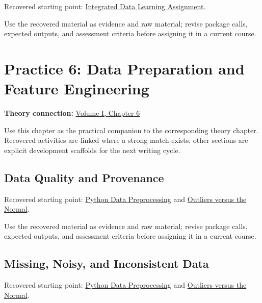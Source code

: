 \documentclass[
  letterpaper,
]{scrbook}
\begin{document}
Recovered starting point:
\hyperref[sec-lab-integrated-learning-assignment]{Integrated Data
Learning Assignment}.

Use the recovered material as evidence and raw material; revise package
calls, expected outputs, and assessment criteria before assigning it in
a current course.

\chapter*{Practice 6: Data Preparation and Feature
Engineering}\label{ch-practice-06}


\textbf{Theory connection:} \hyperref[ch-preparation]{Volume I, Chapter
6}

Use this chapter as the practical companion to the corresponding theory
chapter. Recovered activities are linked where a strong match exists;
other sections are explicit development scaffolds for the next writing
cycle.

\section*{Data Quality and
Provenance}\label{sec-pr-06-data-quality-and-provenance}


Recovered starting point: \hyperref[sec-lab-data-preprocessing]{Python
Data Preprocessing} and \hyperref[sec-lab-outliers]{Outliers versus the
Normal}.

Use the recovered material as evidence and raw material; revise package
calls, expected outputs, and assessment criteria before assigning it in
a current course.

\section*{Missing, Noisy, and Inconsistent
Data}\label{sec-pr-06-missing-noisy-and-inconsistent-data}


Recovered starting point: \hyperref[sec-lab-data-preprocessing]{Python
Data Preprocessing} and \hyperref[sec-lab-outliers]{Outliers versus the
Normal}.
\end{document}
